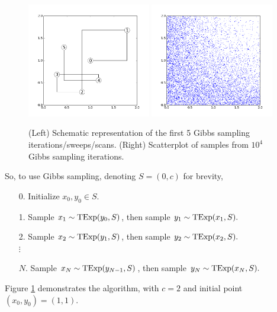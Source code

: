 \documentclass[12pt]{article}
\begin{document}
\begin{figure}
  \begin{center}
    \includegraphics[width=0.48\textwidth]{toy-numbered.png}
    \includegraphics[width=0.48\textwidth]{toy-scatter.png}
  \end{center}
  \caption{(Left) Schematic representation of the first 5 Gibbs sampling iterations/sweeps/scans. (Right) Scatterplot of samples from $10^4$ Gibbs sampling iterations.}
  \label{figure:toy}
\end{figure}

So, to use Gibbs sampling, denoting $S=(0,c)$ for brevity,
\begin{enumerate}
    \item[0.] Initialize $x_0,y_0\in S$.
    \item[1.] Sample $x_1\sim \operatorname*{TExp}(y_0,S)$, then sample $y_1\sim \operatorname*{TExp}(x_1,S).$
    \item[2.] Sample $x_2\sim \operatorname*{TExp}(y_1,S)$, then sample $y_2\sim \operatorname*{TExp}(x_2,S).$\\
        $\vdots$
    \item[$N$.] Sample $x_N\sim \operatorname*{TExp}(y_{N-1},S)$, then sample $y_N\sim \operatorname*{TExp}(x_N,S).$
\end{enumerate}
Figure \ref{figure:toy} demonstrates the algorithm, with $c = 2$ and initial point $(x_0, y_0) = (1, 1)$.
\end{document}
